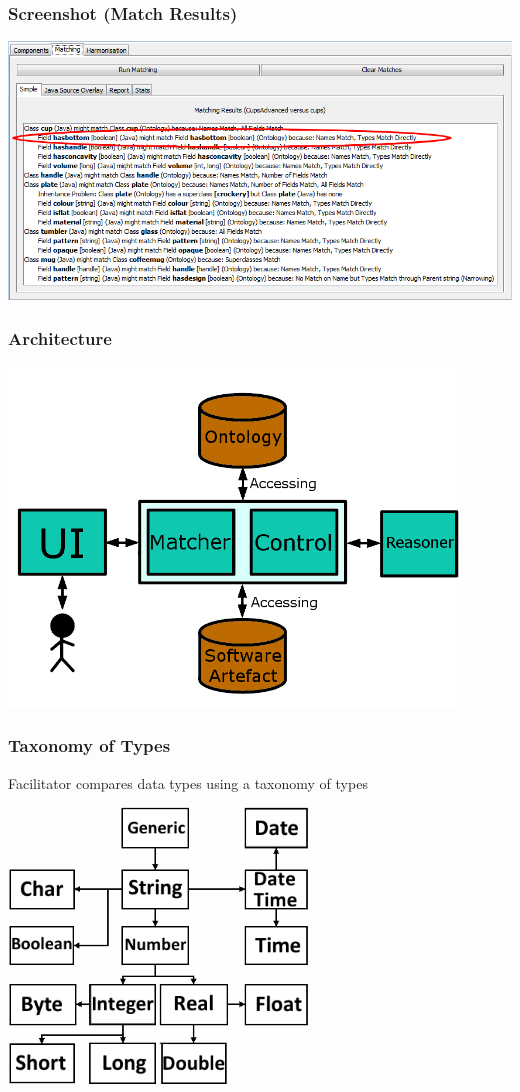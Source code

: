 \documentclass{beamer}
\begin{document}
\begin{frame}
\frametitle{Screenshot (Match Results)}
\centerline{\includegraphics[width=\paperwidth]{MatchingScreen-FieldHighlight}}
\end{frame}

\begin{frame}
\frametitle{Architecture}
\centerline{\includegraphics[width=0.9\textwidth]{SoftwareArchitecture}}
\end{frame}

\begin{frame}
\frametitle{Taxonomy of Types}
Facilitator compares data types using a taxonomy of types\newline{}
\newline{}
\centerline{\includegraphics[width=0.6\textwidth]{TaxonomyOfTypes}}
\end{frame}
\end{document}
